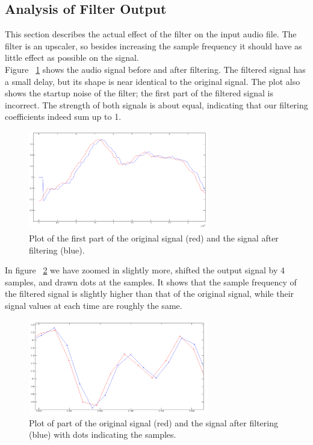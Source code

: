\subsection{Analysis of Filter Output }
This section describes the actual effect of the filter on the input audio file. The filter is an upscaler, so besides increasing the sample frequency it should have as little effect as possible on the signal.\\

Figure ~\ref{fig:plot1} shows the audio signal before and after filtering. The filtered signal has a small delay, but its shape is near identical to the original signal. The plot also shows the startup noise of the filter; the first part of the filtered signal is  incorrect. The strength of both signals is about equal, indicating that our filtering coefficients indeed sum up to 1. \\

\begin{figure}
\begin{center}
\includegraphics[width=0.7\textwidth]{images/samples3.png}
\caption{Plot of the first part of the original signal (red) and the signal after filtering (blue).}
\label{fig:plot1}
\end{center}
\end{figure}

In figure ~\ref{fig:plot2} we have zoomed in slightly more, shifted the output signal by 4 samples, and drawn dots at the samples. It shows that the sample frequency of the filtered signal is slightly higher than that of the original signal, while their signal values at each time are roughly the same.

\begin{figure}
\begin{center}
\includegraphics[width=0.7\textwidth]{images/samples.png}
\caption{Plot of part of the original signal (red) and the signal after filtering (blue) with dots indicating the samples.}
\label{fig:plot2}
\end{center}
\end{figure}

